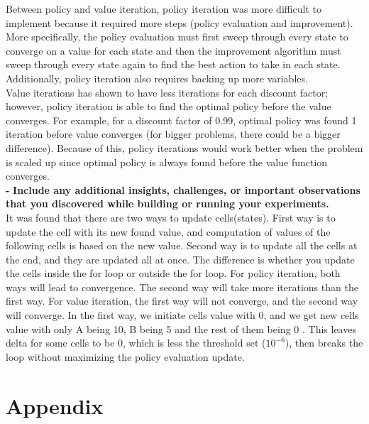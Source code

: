 \documentclass[11pt]{article}
\begin{document}
\noindent
Between policy and value iteration, policy iteration was more difficult to
implement because it required more steps (policy evaluation and improvement).
More specifically, the policy evaluation must first sweep through every state
to converge on a value for each state and then the improvement algorithm must
sweep through every state again to find the best action to take in each state.
Additionally, policy iteration also requires backing up more variables.
\\

\noindent
Value iterations has shown to have less iterations for each discount factor;
however, policy iteration is able to find the optimal policy before the value
converges. For example, for a discount factor of 0.99, optimal policy was found
1 iteration before value converges (for bigger problems, there could be a bigger
difference). Because of this, policy iterations would work better when the
problem is scaled up since optimal policy is always found before the value
function converges.\\

\noindent
\textbf{-}
\noindent
\textbf{Include any additional insights, challenges, or important observations
that you discovered while building or running your experiments.}
\\

\noindent
It was found that there are two ways to update cells(states). First way is to
update the cell with its new found value, and computation of values of the
following cells is based on the new value. Second way is to update all the cells
at the end, and they are updated all at once. The difference is whether you
update the cells inside the for loop or outside the for loop. For policy
iteration, both ways will lead to convergence. The second way will take more
iterations than the first way. For value iteration, the first way will not
converge, and the second way will converge.  In the first way, we initiate cells
value with 0, and we get new cells value with only A being 10, B being 5 and the
rest of them being 0 . This leaves delta for some cells to be 0, which is less
the threshold set ($10^{-6}$), then breaks the loop without maximizing the
policy evaluation update. \\

\newpage
\section{Appendix}
\end{document}
